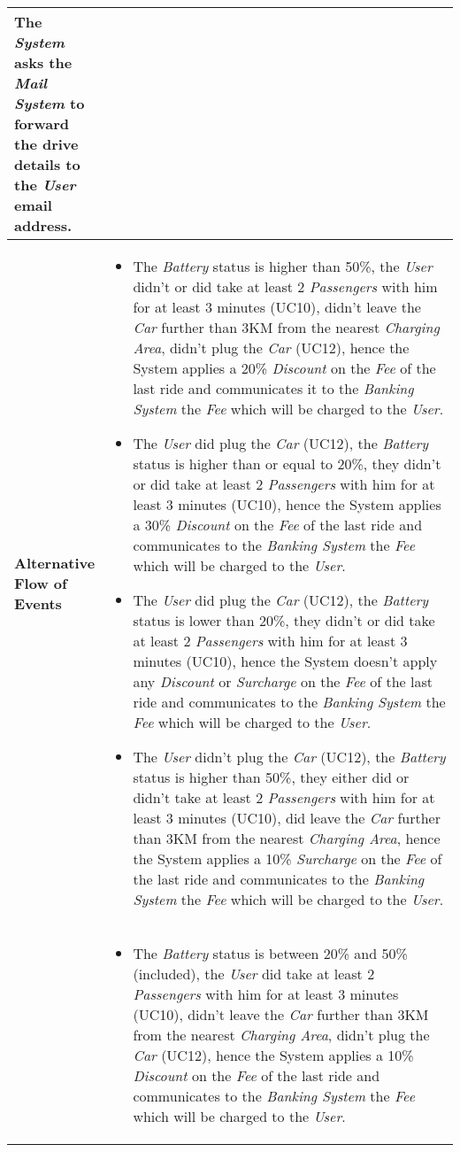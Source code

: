 \begin{longtable}{|p{0.2\linewidth} p{0.8\linewidth}|}
	The \emph{System} asks the \emph{Mail System} to forward the drive details to the \emph{User} email address. \\ \hline
		\textbf{Alternative Flow of Events} &
	\begin{itemize}
		\item The \emph{Battery} status is higher than 50\%, the \emph{User} didn't or did take at least 2 \emph{Passengers} with him for at least 3 minutes (UC10), didn't leave the \emph{Car} further than 3KM from the nearest \emph{Charging Area}, didn't plug the \emph{Car} (UC12), hence the System applies a 20\% \emph{Discount} on the \emph{Fee} of the last ride and communicates it to the \emph{Banking System} the \emph{Fee} which will be charged to the \emph{User}.
		\item The \emph{User} did plug the \emph{Car} (UC12), the \emph{Battery} status is higher than or equal to 20\%, they didn't or did take at least 2 \emph{Passengers} with him for at least 3 minutes (UC10), hence the System applies a 30\% \emph{Discount} on the \emph{Fee} of the last ride and communicates to the \emph{Banking System} the \emph{Fee} which will be charged to the \emph{User}.
		\item The \emph{User} did plug the \emph{Car} (UC12), the \emph{Battery} status is lower than 20\%, they didn't or did take at least 2 \emph{Passengers} with him for at least 3 minutes (UC10), hence the System doesn't apply any \emph{Discount} or \emph{Surcharge} on the \emph{Fee} of the last ride and communicates to the \emph{Banking System} the \emph{Fee} which will be charged to the \emph{User}.
		\item The \emph{User} didn't plug the \emph{Car} (UC12), the \emph{Battery} status is higher than 50\%, they either did or didn't take at least 2 \emph{Passengers} with him for at least 3 minutes (UC10), did leave the \emph{Car} further than 3KM from the nearest \emph{Charging Area}, hence the System applies a 10\% \emph{Surcharge} on the \emph{Fee} of the last ride and communicates to the \emph{Banking System} the \emph{Fee} which will be charged to the \emph{User}.
		\end{itemize} \\ &
		\begin{itemize}
		\item The \emph{Battery} status is between 20\% and 50\% (included), the \emph{User} did take at least 2 \emph{Passengers} with him for at least 3 minutes (UC10), didn't leave the \emph{Car} further than 3KM from the nearest \emph{Charging Area}, didn't plug the \emph{Car} (UC12), hence the System applies a 10\% \emph{Discount} on the \emph{Fee} of the last ride and communicates to the \emph{Banking System} the \emph{Fee} which will be charged to the \emph{User}.

\end{itemize}
\end{longtable}
